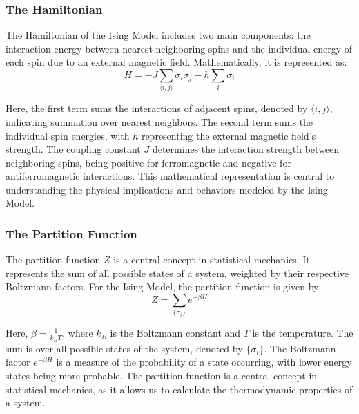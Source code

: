 \subsubsection{The Hamiltonian}
The Hamiltonian of the Ising Model includes two main components: the interaction
energy between nearest neighboring spins and the individual energy of each spin
due to an external magnetic field. Mathematically, it is represented as:
\begin{equation}
  \label{eq:hamiltonian}
  H = -J \sum_{\langle i,j \rangle} \sigma_i \sigma_j - h \sum_{i} \sigma_i
\end{equation}

Here, the first term sums the interactions of adjacent spins, denoted by
$\langle i,j \rangle$, indicating summation over nearest neighbors. The second
term sums the individual spin energies, with $h$ representing the external
magnetic field's strength. The coupling constant $J$ determines the interaction
strength between neighboring spins, being positive for ferromagnetic and
negative for antiferromagnetic interactions. This mathematical representation is
central to understanding the physical implications and behaviors modeled by the
Ising Model.

\subsubsection{The Partition Function}
The partition function $Z$ is a central concept in statistical mechanics. It
represents the sum of all possible states of a system, weighted by their
respective Boltzmann factors. For the Ising Model, the partition function is
given by:
\begin{equation}
  \label{eq:partition}
  Z = \sum_{\{\sigma_i\}} e^{-\beta H}
\end{equation}

Here, $\beta = \frac{1}{k_B T}$, where $k_B$ is the Boltzmann constant and $T$
is the temperature. The sum is over all possible states of the system, denoted
by $\{\sigma_i\}$. The Boltzmann factor $e^{-\beta H}$ is a measure of the
probability of a state occurring, with lower energy states being more probable.
The partition function is a central concept in statistical mechanics, as it
allows us to calculate the thermodynamic properties of a system.

